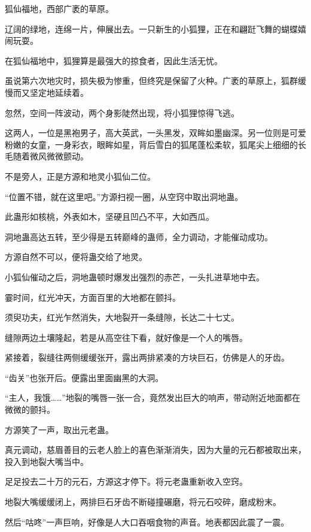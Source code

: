 
\begin{this_body}

狐仙福地，西部广袤的草原。

辽阔的绿地，连绵一片，伸展出去。一只新生的小狐狸，正在和翩跹飞舞的蝴蝶嬉闹玩耍。

在狐仙福地中，狐狸算是最强大的掠食者，因此生活无忧。

虽说第六次地灾时，损失极为惨重，但终究是保留了火种。广袤的草原上，狐群缓慢而又坚定地延续着。

忽然，空间一阵波动，两个身影陡然出现，将小狐狸惊得飞逃。

这两人，一位是黑袍男子，高大英武，一头黑发，双眸如墨幽深。另一位则是可爱粉嫩的女童，一身彩衣，眼眸如星，背后雪白的狐尾蓬松柔软，狐尾尖上细细的长毛随着微风微微颤动。

不是旁人，正是方源和地灵小狐仙二位。

“位置不错，就在这里吧。”方源扫视一圈，从空窍中取出洞地蛊。

此蛊形如核桃，外表如木，坚硬且凹凸不平，大如西瓜。

洞地蛊高达五转，至少得是五转巅峰的蛊师，全力调动，才能催动成功。

方源自然不可以，便将蛊交给了地灵。

小狐仙催动之后，洞地蛊顿时爆发出强烈的赤芒，一头扎进草地中去。

霎时间，红光冲天，方面百里的大地都在颤抖。

须臾功夫，红光乍然消失，大地裂开一条缝隙，长达二十七丈。

缝隙两边土壤隆起，若是从高空往下看，就好像是一个人的嘴唇。

紧接着，裂缝往两侧缓缓张开，露出两排紧凑的方块巨石，仿佛是人的牙齿。

“齿关”也张开后。便露出里面幽黑的大洞。

“主人，我饿……”地裂的嘴唇一张一合，竟然发出巨大的响声，带动附近地面都在微微的颤抖。

方源笑了一声，取出元老蛊。

真元调动，慈眉善目的云老人脸上的喜色渐渐消失，因为大量的元石都被取出来，投入到地裂大嘴当中。

足足投去二十万的元石，方源这才停下。将元老蛊重新收入空窍。

地裂大嘴缓缓闭上，两排巨石牙齿不断碰撞碾磨，将元石咬碎，磨成粉末。

然后“咕咚”一声巨响，好像是人大口吞咽食物的声音。地表都因此震了一震。


\end{this_body}
